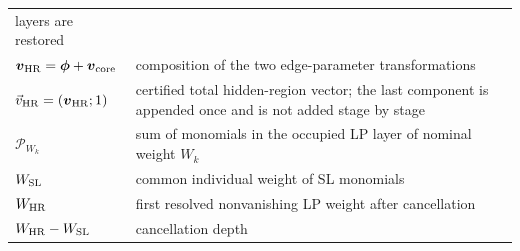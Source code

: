 \documentclass[a4paper,11pt]{article}
\newcommand{\HR}{\mathrm{HR}}
\newcommand{\WSL}{W_{\rm SL}}
\newcommand{\WHR}{W_{\rm HR}}
\newcommand{\vHR}{\vec v_{\rm HR}}
\begin{document}
\begin{longtable}{@{}p{}p{}@{}}
  layers are restored\\
\(\boldsymbol v_{\HR}=\boldsymbol\phi+\boldsymbol v_{\rm core}\) & composition of the
  two edge-parameter transformations\\
\(\vHR=(\boldsymbol v_{\HR};1)\) & certified total hidden-region vector; the
  last component is appended once and is not added stage by stage\\
\(\mathcal P_{W_k}\) & sum of monomials in the occupied LP layer of nominal
  weight \(W_k\)\\
\(\WSL\) & common individual weight of SL monomials\\
\(\WHR\) & first resolved nonvanishing LP weight after cancellation\\
\(\WHR-\WSL\) & cancellation depth\\
\end{longtable}
\endgroup






\end{document}
